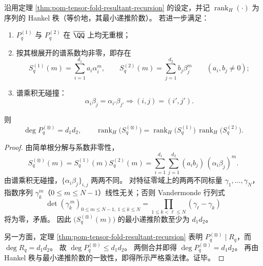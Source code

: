 \begin{corollary}\label{cor:pom-tensor-fold-hankel-rank-multiplicativity}
沿用定理 \ref{thm:pom-tensor-fold-resultant-recursion} 的设定，并记
\(
\operatorname{rank}_H(\cdot)
\)
为序列的 Hankel 秩（等价地，其最小递推阶数）。
若进一步满足：
\begin{enumerate}
  \item \(P_q^{(1)}\) 与 \(P_q^{(2)}\) 在 \(\overline{\QQ}\) 上均无重根；
  \item 按其根展开的谱系数均非零，即存在
  \[
  S_q^{(1)}(m)=\sum_{i=1}^{d_1}a_i\alpha_i^m,
  \qquad
  S_q^{(2)}(m)=\sum_{j=1}^{d_2}b_j\beta_j^m
  \qquad(a_i,b_j\neq 0) ;
  \]
  \item 谱乘积无碰撞：
  \[
  \alpha_i\beta_j=\alpha_{i'}\beta_{j'}
  \Longrightarrow
  (i,j)=(i',j').
  \]
\end{enumerate}
则
\[
\deg P_q^{(\otimes)}=d_1d_2,
\qquad
\operatorname{rank}_H\!\bigl(S_q^{(\otimes)}\bigr)
=\operatorname{rank}_H\!\bigl(S_q^{(1)}\bigr)\,
\operatorname{rank}_H\!\bigl(S_q^{(2)}\bigr).
\]
\end{corollary}
\begin{proof}
由简单根分解与系数非零性，
\[
S_q^{(\otimes)}(m)
=S_q^{(1)}(m)S_q^{(2)}(m)
=\sum_{i=1}^{d_1}\sum_{j=1}^{d_2}(a_ib_j)\,(\alpha_i\beta_j)^m.
\]
由谱乘积无碰撞，\(\{\alpha_i\beta_j\}_{i,j}\) 两两不同。
对特征零域上的两两不同标量 \(\gamma_1,\dots,\gamma_N\)，指数序列 \(\gamma_k^m\)（\(0\le m\le N-1\)）线性无关；否则 Vandermonde 行列式
\[
\det(\gamma_k^{\,m})_{0\le m\le N-1,\ 1\le k\le N}
=\prod_{1\le k<\ell\le N}(\gamma_\ell-\gamma_k)
\]
将为零，矛盾。
因此 \(\bigl(S_q^{(\otimes)}(m)\bigr)\) 的最小递推阶数至少为 \(d_1d_2\)。

另一方面，定理 \ref{thm:pom-tensor-fold-resultant-recursion} 表明
\(
P_q^{(\otimes)}\mid R_q
\)，而 \(\deg R_q=d_1d_2\)。
故 \(\deg P_q^{(\otimes)}\le d_1d_2\)。
两侧合并即得 \(\deg P_q^{(\otimes)}=d_1d_2\)。
再由 Hankel 秩与最小递推阶数的一致性，即得所示严格乘法律。证毕。
\end{proof}

\endinput
